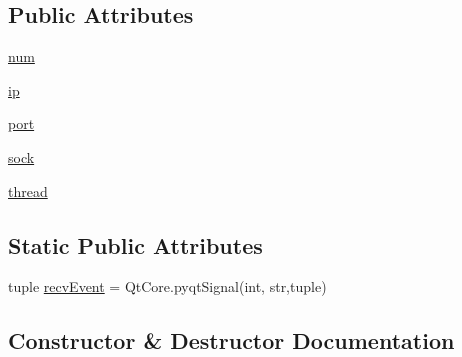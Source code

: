 \subsection*{Public Attributes}
\begin{DoxyCompactItemize}
\item 
\hyperlink{classnetwork_1_1commsChannel_1_1UDPChannel_af43851623627900a93360187e7a4b5a0}{num}
\item 
\hyperlink{classnetwork_1_1commsChannel_1_1UDPChannel_a13939ef9b0ba434e2bb786d19f450b48}{ip}
\item 
\hyperlink{classnetwork_1_1commsChannel_1_1UDPChannel_a6b1a61243c41a625092986e6b38959e9}{port}
\item 
\hyperlink{classnetwork_1_1commsChannel_1_1UDPChannel_a19e4c1af17dc22d1c378ac53280fe679}{sock}
\item 
\hyperlink{classnetwork_1_1commsChannel_1_1UDPChannel_a8def8c5020988707811a671264d3b8b7}{thread}
\end{DoxyCompactItemize}
\subsection*{Static Public Attributes}
\begin{DoxyCompactItemize}
\item 
tuple \hyperlink{classnetwork_1_1commsChannel_1_1UDPChannel_ae1f826ff9e1f0eda9f4ef7127da5512b}{recv\+Event} = Qt\+Core.\+pyqt\+Signal(int, str,tuple)
\end{DoxyCompactItemize}


\subsection{Constructor \& Destructor Documentation}
\hypertarget{classnetwork_1_1commsChannel_1_1UDPChannel_ae3e90f5c66765ae3f5d97334bb9767ad}{}
